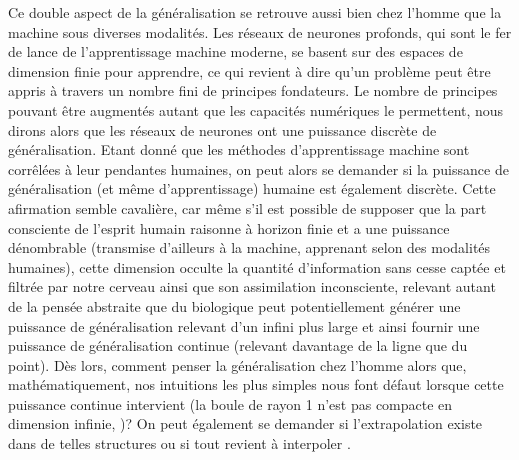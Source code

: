      Ce double aspect de la généralisation se retrouve aussi bien chez l'homme que la machine sous diverses modalités. Les réseaux de neurones profonds, qui sont le fer de lance de l'apprentissage machine moderne, se basent sur des espaces de dimension finie pour apprendre, ce qui revient à dire qu'un problème peut être appris à travers un nombre fini de principes fondateurs. Le nombre de principes pouvant être augmentés autant que les capacités numériques le permettent, nous dirons alors que les réseaux de neurones ont une puissance discrète de généralisation. Etant donné que les méthodes d'apprentissage machine sont corrêlées à leur pendantes humaines, on peut alors se demander si la puissance de généralisation (et même d'apprentissage) humaine est également discrète. Cette afirmation semble cavalière, car même s'il est possible de supposer que la part consciente de l'esprit humain raisonne à horizon finie et a une puissance dénombrable (transmise d'ailleurs à la machine, apprenant selon des modalités humaines), cette dimension occulte la quantité d'information  sans cesse captée et filtrée par notre cerveau ainsi que son assimilation inconsciente, relevant autant de la pensée abstraite que du biologique peut potentiellement générer une puissance de généralisation relevant d'un infini plus large et ainsi fournir une puissance de généralisation continue (relevant davantage de la ligne que du point). Dès lors, comment penser la généralisation chez l'homme alors que, mathématiquement, nos intuitions les plus simples nous font défaut lorsque cette puissance continue intervient (la boule de rayon 1 n'est pas compacte en dimension infinie, \citealp{riesz1955lecons})? On peut également se demander si l'extrapolation existe dans de telles structures ou si tout revient à interpoler \citep{hasson2020direct}.
    

